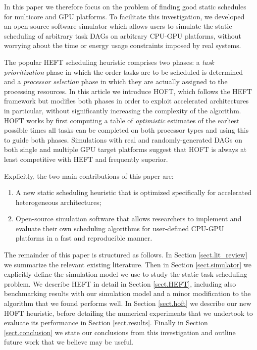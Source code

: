 \documentclass[runningheads]{llncs}
\begin{document}
In this paper we therefore focus on the problem of finding good static schedules for multicore and GPU platforms. To facilitate this investigation, we developed an open-source software simulator which allows users to simulate the static scheduling of arbitrary task DAGs on arbitrary CPU-GPU platforms, without worrying about the time or energy usage constraints imposed by real systems.   

The popular HEFT scheduling heuristic comprises two phases: a {\em task prioritization} phase in which the order tasks are to be scheduled is determined and a {\em processor selection} phase in which they are actually assigned to the processing resources. In this article we introduce HOFT, which follows the HEFT framework but modifies both phases in order to exploit accelerated architectures in particular, without significantly increasing the complexity of the algorithm. HOFT works by first computing a table of {\em optimistic} estimates of the earliest possible times all tasks can be completed on both processor types and using this to guide both phases. Simulations with real and randomly-generated DAGs on both single and multiple GPU target platforms suggest that HOFT is always at least competitive with HEFT and frequently superior.     

Explicitly, the two main contributions of this paper are:
\begin{enumerate}	
	\item A new static scheduling heuristic that is optimized specifically for accelerated heterogeneous architectures;
	\item Open-source simulation software that allows researchers to implement and evaluate their own scheduling algorithms for user-defined CPU-GPU platforms in a fast and reproducible manner.
\end{enumerate} 
The remainder of this paper is structured as follows. In Section \ref{sect.lit_review} we summarize the relevant existing literature. Then in Section \ref{sect.simulator} we explicitly define the simulation model we use to study the static task scheduling problem. We describe HEFT in detail in Section \ref{sect.HEFT}, including also benchmarking results with our simulation model and a minor modification to the algorithm that we found performs well. In Section \ref{sect.hoft} we describe our new HOFT heuristic, before detailing the numerical experiments that we undertook to evaluate its performance in Section \ref{sect.results}. Finally in Section \ref{sect.conclusion} we state our conclusions from this investigation and outline future work that we believe may be useful.
 
\end{document}

